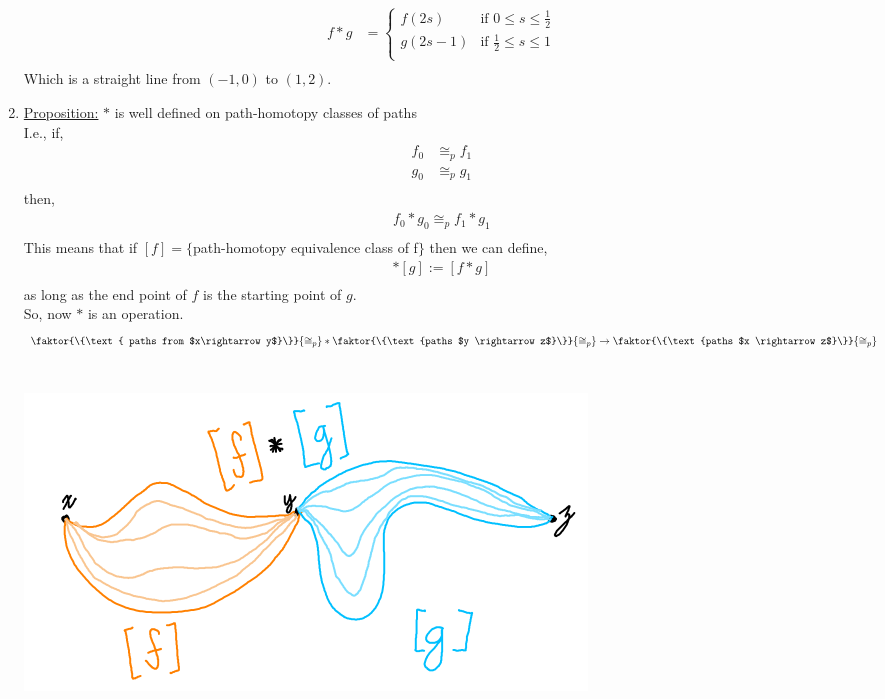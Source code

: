 \begin{enumerate}
            \begin{align*}
                f*g &= \begin{cases}
                    f(2s) & \text{if }0\leq s \le \frac{1}{2}\\
                    g(2s-1) & \text{if }\frac{1}{2}\leq s \le 1\\
                \end{cases}\\
            \end{align*}
            Which is a straight line from $(-1,0)$ to $(1,2)$.
        \item \underline{Proposition:} $*$ is well defined on path-homotopy classes of paths\\
            I.e., if,
            \begin{align*}
                f_0&\cong_{p}f_1\\
                g_0&\cong_{p}g_1\\
            \end{align*}
            then,
            \begin{align*}
                f_0*g_0\cong_{p}f_1*g_1\\
            \end{align*}
            This means that if $[f]=\{$path-homotopy equivalence class of f$\}$ then we can define,
            \begin{align*}
                [f]*[g]:=[f*g]\\
            \end{align*}
            as long as the end point of $f$ is the starting point of $g$.\\
            So, now $*$ is an operation.
            \begin{align*}
                \faktor{\{\text{ paths from $x\rightarrow y$}\}}{\cong_{p}}*\faktor{\{\text{paths $y \rightarrow z$}\}}{\cong_p}\rightarrow
                \faktor{\{\text{paths $x \rightarrow z$}\}}{\cong_{p}}\\
            \end{align*}\\
            \begin{minipage}[c]{\linewidth}
                \begin{center}
                    \includegraphics[width=\linewidth]{images/homotopy_class_concat.png}

\end{center}
\end{minipage}
\end{enumerate}
